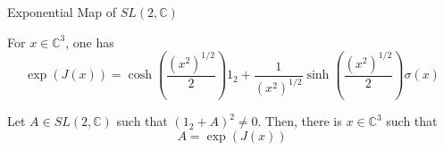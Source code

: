 \begin{frame}{Exponential Map of $SL(2,\mathbb{C})$}
    \begin{proposition}[10.1.5]
        For $x \in \mathbb{C}^3$, one has
        \[ \exp(J(x)) = \cosh\left(\frac{(x^2)^{1/2}}{2}\right)1_2 + \frac{1}{(x^2)^{1/2}}\sinh\left(\frac{(x^2)^{1/2}}{2}\right)\sigma(x) \]
    \end{proposition}

    \begin{proposition}[10.1.6]
        Let $A \in SL(2,\mathbb{C})$ such that $(1_2 + A)^2 \neq 0$. Then, there is $x \in \mathbb{C}^3$ such that
        \[ A = \exp(J(x)) \]
    \end{proposition}
\end{frame}